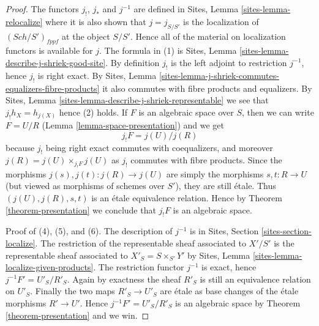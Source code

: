 \documentclass[10pt,a4paper]{amsart}
\theoremstyle{plain}
\theoremstyle{definition}
\theoremstyle{remark}
\numberwithin{equation}{subsection}
\def\Sch{\mathit{Sch}}
\begin{document}
\begin{proof}
The functors $j_!$, $j_*$ and $j^{-1}$ are defined in
Sites, Lemma \ref{sites-lemma-relocalize}
where it is also shown that $j = j_{S/S'}$ is the localization
of $(\Sch/S')_{fppf}$ at the object $S/S'$. Hence
all of the material on localization functors is available for $j$.
The formula in (1) is
Sites, Lemma \ref{sites-lemma-describe-j-shriek-good-site}.
By definition $j_!$ is the left adjoint to restriction $j^{-1}$,
hence $j_!$ is right exact. By
Sites, Lemma \ref{sites-lemma-j-shriek-commutes-equalizers-fibre-products}
it also commutes with fibre products and equalizers.
By
Sites, Lemma \ref{sites-lemma-describe-j-shriek-representable}
we see that $j_!h_X = h_{j(X)}$ hence (2) holds.
If $F$ is an algebraic space over $S$, then we can write $F = U/R$
(Lemma \ref{lemma-space-presentation})
and we get
$$
j_!F = j(U)/j(R)
$$
because $j_!$ being right exact commutes with coequalizers, and moreover
$j(R) = j(U) \times_{j_!F} j(U)$ as $j_!$ commutes with fibre products.
Since the morphisms $j(s), j(t) : j(R) \to j(U)$ are simply the morphisms
$s, t : R \to U$ (but viewed as morphisms of schemes over $S'$), they
are still \'etale. Thus $(j(U), j(R), s, t)$ is an \'etale equivalence relation.
Hence by
Theorem \ref{theorem-presentation}
we conclude that $j_!F$ is an algebraic space.

\medskip\noindent
Proof of (4), (5), and (6). The description of $j^{-1}$ is in
Sites, Section \ref{sites-section-localize}.
The restriction of the representable sheaf associated to $X'/S'$
is the representable sheaf associated to
$X'_S = S \times_{S'} Y'$ by
Sites, Lemma \ref{sites-lemma-localize-given-products}.
The restriction functor $j^{-1}$ is exact, hence $j^{-1}F' = U'_S/R'_S$.
Again by exactness the sheaf $R'_S$ is still an equivalence relation on
$U'_S$. Finally the two maps $R'_S \to U'_S$ are \'etale as base changes
of the \'etale morphisms $R' \to U'$. Hence $j^{-1}F' = U'_S/R'_S$ is
an algebraic space by
Theorem \ref{theorem-presentation}
and we win.
\end{proof}
\end{document}
